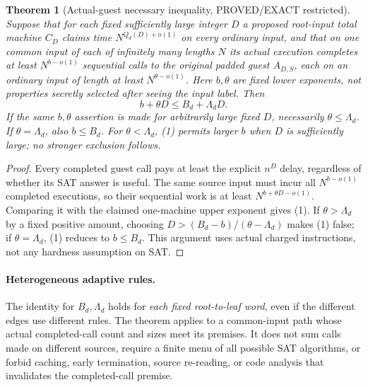 \documentclass[11pt]{article}
\newtheorem{theorem}{Theorem}
\begin{document}
\begin{theorem}[Actual-guest necessary inequality, PROVED/EXACT restricted]
Suppose that for each fixed sufficiently large integer $D$ a proposed
root-input total machine $C_D$ claims time $N^{Q_d(D)+o(1)}$ on every ordinary
input, and that on \emph{one common input of each of infinitely many lengths}
$N$ its actual execution completes at least $N^{b-o(1)}$ \emph{sequential}
calls to the original padded guest $A_{D,S}$, each on an ordinary input of
length at least $N^{\theta-o(1)}$. Here $b,\theta$ are fixed lower exponents,
not properties secretly selected after seeing the input label. Then
\[
 \boxed{b+\theta D\le B_d+\Lambda_dD.} \tag{1}
\]
If the same $b,\theta$ assertion is made for arbitrarily large fixed $D$,
necessarily $\theta\le\Lambda_d$. If $\theta=\Lambda_d$, also $b\le B_d$.
For $\theta<\Lambda_d$, (1) permits larger $b$ when $D$ is sufficiently
large; no stronger exclusion follows.
\end{theorem}
\begin{proof}
Every completed guest call pays at least the explicit $n^D$ delay, regardless
of whether its SAT answer is useful. The same source input must incur all
$N^{b-o(1)}$ completed executions, so their sequential work is at least
$N^{b+\theta D-o(1)}$. Comparing it with the claimed one-machine upper
exponent gives (1). If $\theta>\Lambda_d$ by a fixed positive amount, choosing
$D>(B_d-b)/(\theta-\Lambda_d)$ makes (1) false; if
$\theta=\Lambda_d$, (1) reduces to $b\le B_d$. This argument uses actual
charged instructions, not any hardness assumption on SAT.\end{proof}

\paragraph{Heterogeneous adaptive rules.}
The identity for $B_d,\Lambda_d$ holds for \emph{each fixed root-to-leaf
word}, even if the different edges use different rules. The theorem applies
to a common-input path whose actual completed-call count and sizes meet its
premises. It does not sum calls made on different sources, require a finite
menu of all possible SAT algorithms, or forbid caching, early termination,
source re-reading, or code analysis that invalidates the completed-call
premise.
\end{document}
